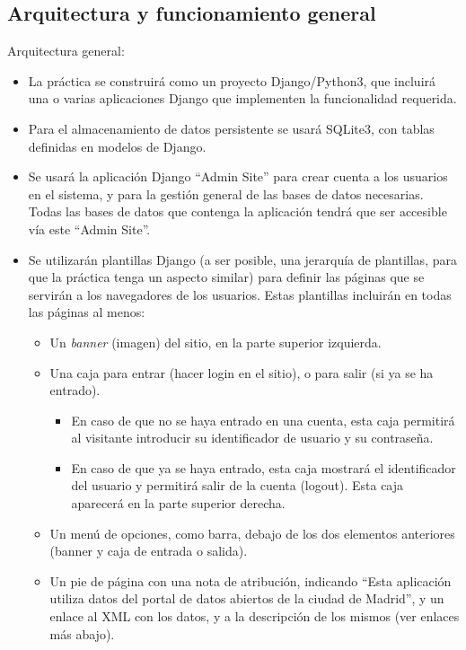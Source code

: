 \subsection{Arquitectura y funcionamiento general}

Arquitectura general:

\begin{itemize}

  \item La práctica se construirá como un proyecto Django/Python3, que incluirá una o varias aplicaciones Django que implementen la funcionalidad requerida.

  \item Para el almacenamiento de datos persistente se usará SQLite3, con tablas definidas en modelos de Django.

  \item Se usará la aplicación Django ``Admin Site'' para crear cuenta a los usuarios en el sistema, y para la gestión general de las bases de datos necesarias. Todas las bases de datos que contenga la aplicación tendrá que ser accesible vía este ``Admin Site''.

  \item Se utilizarán plantillas Django (a ser posible, una jerarquía de plantillas, para que la práctica tenga un aspecto similar) para definir las páginas que se servirán a los navegadores de los usuarios. Estas plantillas incluirán en todas las páginas al menos:
  \begin{itemize}
  \item Un \emph{banner} (imagen) del sitio, en la parte superior izquierda.
  \item Una caja para entrar (hacer login en el sitio), o para salir (si ya se ha entrado).
  \begin{itemize}
    \item En caso de que no se haya entrado en una cuenta, esta caja permitirá al visitante introducir su identificador de usuario y su contraseña. 
    \item En caso de que ya se haya entrado, esta caja mostrará el identificador del usuario y permitirá salir de la cuenta (logout). Esta caja aparecerá en la parte superior derecha.
  \end{itemize}
  \item Un menú de opciones, como barra, debajo de los dos elementos anteriores (banner y caja de entrada o salida).
  \item Un pie de página con una nota de atribución, indicando ``Esta aplicación utiliza datos del portal de datos abiertos de la ciudad de Madrid'', y un enlace al XML con los datos, y a la descripción de los mismos (ver enlaces más abajo).
  \end{itemize}


\end{itemize}
